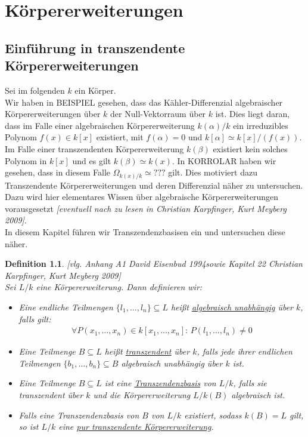 \documentclass[10pt,a4paper]{report}
\newcommand{\comment}[1]{}
\newcommand{\ModulsOfDifferenzials}{David Eisenbud 1994}
\newcommand{\Algebra}{Christian Karpfinger, Kurt Meyberg 2009}
\newcounter{Aussage}[chapter]
\newtheorem{definition}[Aussage]{Definition}
\newcommand{\divR}[2]{\Omega_{#1/#2}}
\begin{document}
\chapter{Körpererweiterungen}
\section{Einführung in transzendente Körpererweiterungen}
Sei im folgenden $k$ ein Körper.\\
Wir haben in BEISPIEL \comment{\label{*Differenzial algebraischer Körpererweiteerungen ist Null}} gesehen, dass das Kähler-Differenzial algebraischer Körpererweiterungen über $k$ der Null-Vektorraum über $k$ ist. Dies liegt daran, dass im Falle einer algebraischen Körpererweiterung $k(\alpha)/k$ ein irreduzibles Polynom $f(x) \in k[x]$ existiert, mit $f(\alpha) = 0$ und $k[\alpha] \simeq k[x]/(f(x))$.\\
Im Falle einer transzendenten Körpererweiterung $k(\beta)$ existiert kein solches Polynom in $k[x]$ und es gilt $k(\beta) \simeq k(x)$. In KORROLAR \comment{\label{*Differenzial rationaler Funktionen}} haben wir gesehen, dass in diesem Falle $\divR{k(x)}{k} \simeq ???$ gilt. Dies motiviert dazu Transzendente Körpererweiterungen und deren Differenzial näher zu untersuchen. Dazu wird hier elementares Wissen über algebraische Körpererweiterungen vorausgesetzt \textit{[eventuell nach zu lesen in \Algebra]}.\\
In diesem Kapitel führen wir Transzendenzbasisen ein und untersuchen diese näher.\\

\begin{definition}\label{Definition Transzendenzbasis}\textit{[vlg. Anhang A1 \ModulsOfDifferenzials sowie Kapitel 22 \Algebra]}\\
Sei $L/k$ eine Körpererweiterung. Dann definieren wir:
\begin{itemize}
\item[•] Eine endliche Teilmengen $\lbrace l_1, \dots ,l_n \rbrace \subseteq L$ heißt \underline{algebraisch unabhängig} über $k$, falls gilt:
\begin{gather*}
\forall P(x_1, \dots , x_n) \in k[x_1,\dots,x_n] : \, P(l_1, \dots , l_n) \neq 0
\end{gather*}
\item[•] Eine Teilmenge $B \subseteq L$ heißt \underline{transzendent} über $k$, falls jede ihrer endlichen Teilmengen $\lbrace b_1, \dots , b_n \rbrace \subseteq B$ algebraisch unabhängig über $k$ ist.
\item[•] Eine Teilmenge $B \subseteq L$ ist eine \underline{Transzendenzbasis} von $L/k$, falls sie transzendent über $k$ und die Körpererweiterung $L/k(B)$ algebraisch ist.
\item[•] Falls eine Transzendenzbasis von $B$ von $L/k$ existiert, sodass $k(B) = L$ gilt, so ist $L/k$ eine \underline{pur transzendente Körpererweiterung}.
\end{itemize}
\end{definition}
\end{document}
